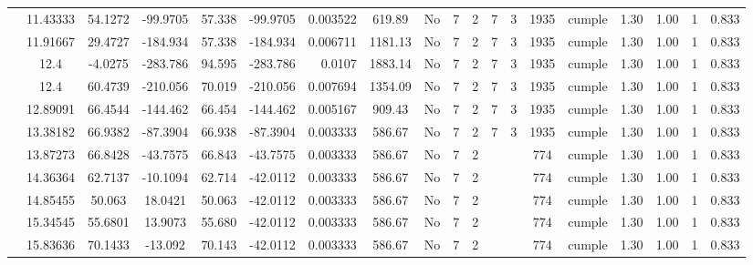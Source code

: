 \begin{table}[H]
{\begin{tabular}{|c|c|c|c|c|c|r|c|c|c|c|c|c|c|c|c|c|c|c|}
\cline{2-19}        & 11.43333 & 54.1272 & -99.9705 & 57.338 & -99.9705 & 0.003522 & 619.89 & No  & 7   & 2   & 7   & 3   & 1935 & \cellcolor[rgb]{ .776,  .937,  .808}cumple & 1.30 & 1.00 & 1   & 0.833 \bigstrut\\
\cline{2-19}        & 11.91667 & 29.4727 & -184.934 & 57.338 & -184.934 & 0.006711 & 1181.13 & No  & 7   & 2   & 7   & 3   & 1935 & \cellcolor[rgb]{ .776,  .937,  .808}cumple & 1.30 & 1.00 & 1   & 0.833 \bigstrut\\
\cline{2-19}        & \cellcolor[rgb]{ .851,  .882,  .949}12.4 & -4.0275 & -283.786 & 94.595 & -283.786 & 0.0107 & 1883.14 & No  & 7   & 2   & 7   & 3   & 1935 & \cellcolor[rgb]{ .776,  .937,  .808}cumple & 1.30 & 1.00 & 1   & 0.833 \bigstrut\\
\cline{2-19}        & \cellcolor[rgb]{ .851,  .882,  .949}12.4 & 60.4739 & -210.056 & 70.019 & -210.056 & 0.007694 & 1354.09 & No  & 7   & 2   & 7   & 3   & 1935 & \cellcolor[rgb]{ .776,  .937,  .808}cumple & 1.30 & 1.00 & 1   & 0.833 \bigstrut\\
\cline{2-19}        & 12.89091 & 66.4544 & -144.462 & 66.454 & -144.462 & 0.005167 & 909.43 & No  & 7   & 2   & 7   & 3   & 1935 & \cellcolor[rgb]{ .776,  .937,  .808}cumple & 1.30 & 1.00 & 1   & 0.833 \bigstrut\\
\cline{2-19}        & 13.38182 & 66.9382 & -87.3904 & 66.938 & -87.3904 & 0.003333 & 586.67 & No  & 7   & 2   & 7   & 3   & 1935 & \cellcolor[rgb]{ .776,  .937,  .808}cumple & 1.30 & 1.00 & 1   & 0.833 \bigstrut\\
\cline{2-19}        & 13.87273 & 66.8428 & -43.7575 & 66.843 & -43.7575 & 0.003333 & 586.67 & No  & 7   & 2   &     &     & 774 & \cellcolor[rgb]{ .776,  .937,  .808}cumple & 1.30 & 1.00 & 1   & 0.833 \bigstrut\\
\cline{2-19}        & 14.36364 & 62.7137 & -10.1094 & 62.714 & -42.0112 & 0.003333 & 586.67 & No  & 7   & 2   &     &     & 774 & \cellcolor[rgb]{ .776,  .937,  .808}cumple & 1.30 & 1.00 & 1   & 0.833 \bigstrut\\
\cline{2-19}        & 14.85455 & 50.063 & 18.0421 & 50.063 & -42.0112 & 0.003333 & 586.67 & No  & 7   & 2   &     &     & 774 & \cellcolor[rgb]{ .776,  .937,  .808}cumple & 1.30 & 1.00 & 1   & 0.833 \bigstrut\\
\cline{2-19}        & 15.34545 & 55.6801 & 13.9073 & 55.680 & -42.0112 & 0.003333 & 586.67 & No  & 7   & 2   &     &     & 774 & \cellcolor[rgb]{ .776,  .937,  .808}cumple & 1.30 & 1.00 & 1   & 0.833 \bigstrut\\
\cline{2-19}        & 15.83636 & 70.1433 & -13.092 & 70.143 & -42.0112 & 0.003333 & 586.67 & No  & 7   & 2   &     &     & 774 & \cellcolor[rgb]{ .776,  .937,  .808}cumple & 1.30 & 1.00 & 1   & 0.833 \bigstrut\\

\end{tabular}}
\end{table}
